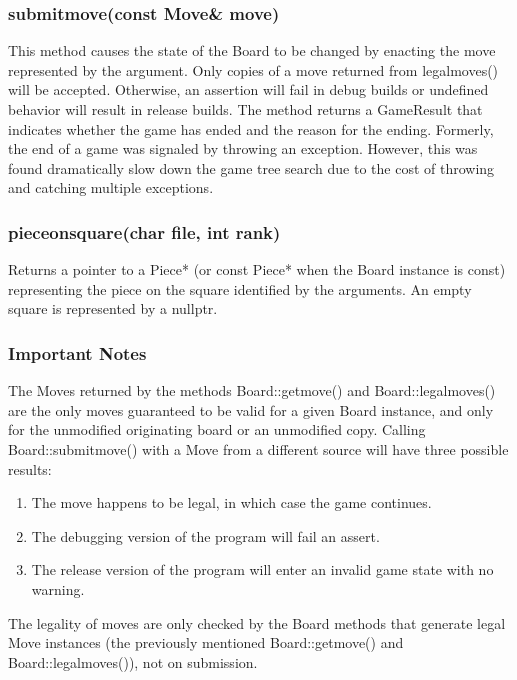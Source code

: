 \documentclass[letterpaper]{article}
\newcommand{\code}[1]{\small\textsf{#1}}
\renewcommand{\_}{\allowbreak\textunderscore\allowbreak}
\begin{document}
\subsubsection[submit\_move()]{submit\_move(const Move\& move)}\label{board-submit-move-section}

This method causes the state of the \code{Board} to be changed by enacting the move represented by the argument. Only copies of a move returned from \code{legal\_moves()} will be accepted. Otherwise, an assertion will fail in debug builds or undefined behavior will result in release builds. The method returns a \code{Game\_Result} that indicates whether the game has ended and the reason for the ending. Formerly, the end of a game was signaled by throwing an exception. However, this was found dramatically slow down the game tree search due to the cost of throwing and catching multiple exceptions.

\subsubsection[piece\_on\_square()]{piece\_on\_square(char file, int rank)}

Returns a pointer to a \code{Piece*} (or \code{const Piece*} when the \code{Board} instance is \code{const}) representing the piece on the square identified by the arguments. An empty square is represented by a \code{nullptr}.

\subsubsection{Important Notes}\label{board_important_notes}
The \code{Move}s returned by the methods \code{Board::get\_move()} and \code{Board::legal\_moves()} are the only moves guaranteed to be valid for a given \code{Board} instance, and only for the unmodified originating board or an unmodified copy. Calling \code{Board::submit\_move()} with a \code{Move} from a different source will have three possible results:
\begin{enumerate}
	\item The move happens to be legal, in which case the game continues.
	\item The debugging version of the program will fail an \code{assert}.
	\item The release version of the program will enter an invalid game state with no warning.
\end{enumerate}
The legality of moves are only checked by the \code{Board} methods that generate legal \code{Move} instances (the previously mentioned \code{Board::get\_move()} and \code{Board::legal\_moves()}), not on submission.
\end{document}
